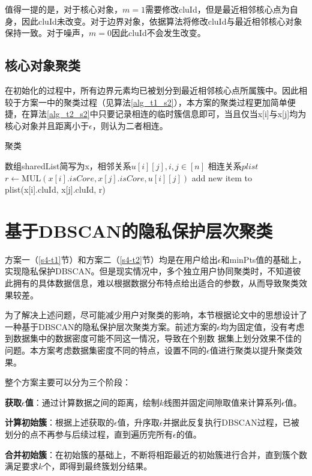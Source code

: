 值得一提的是，对于核心对象，$ m = 1 $需要修改cluId，但是最近相邻核心点为自身，因此cluId未改变。对于边界对象，依据算法将修改cluId与最近相邻核心对象保持一致。对于噪声，$ m=0 $因此cluId不会发生改变。
\subsection{核心对象聚类}
在初始化的过程中，所有边界元素均已被划分到最近相邻核心点所属簇中。因此相较于方案一中的聚类过程（见算法\ref{alg_t1_s2}），本方案的聚类过程更加简单便捷，在算法\ref{alg_t2_s2}中只要记录相连的临时簇信息即可，当且仅当x[i]与x[j]均为核心对象并且距离小于$ \epsilon $，则认为二者相连。
\begin{algorithm}[htbp]
	\renewcommand{\algorithmicrequire}{\textbf{输入:}}
	\renewcommand{\algorithmicensure}{\textbf{输出:}}
	\caption{聚类}
	\label{alg_t2_s2}
	\begin{algorithmic}[1]
		\REQUIRE 数组sharedList简写为x，相邻关系$ u[i][j],i,j\in[n] $
		\ENSURE 相连关系$ plist $
		\STATE $ r \leftarrow \text{MUL}(x[i].isCore, x[j].isCore, u[i][j]) $
		\STATE add new item to plist(x[i].cluId, x[j].cluId, r)
		\ENDFOR
		\ENDFOR
	\end{algorithmic}
\end{algorithm}
\section{基于DBSCAN的隐私保护层次聚类}
\label{s4-t3}
方案一（\ref{s4-t1}节）和方案二（\ref{s4-t2}节）均是在用户给出$\epsilon$和minPts值的基础上，实现隐私保护DBSCAN。但是现实情况中，多个独立用户协同聚类时，不知道彼此拥有的具体数据信息，难以根据数据分布特点给出适合的参数，从而导致聚类效果较差。

为了解决上述问题，尽可能减少用户对聚类的影响，本节根据论文\cite{latifi2021dbhc}中的思想设计了一种基于DBSCAN的隐私保护层次聚类方案。前述方案的$\epsilon$均为固定值，没有考虑到数据集中的数据密度可能不同这一情况，导致在个别数 据集上划分效果不佳的问题。本方案考虑数据集密度不同的特点，设置不同的$\epsilon$值进行聚类以提升聚类效果。

整个方案主要可以分为三个阶段：
\begin{compactitem}
	\item \textbf{获取$\epsilon$值}：通过计算数据之间的距离，绘制$ k $线图并固定间隙取值来计算系列$\epsilon$值。
	\item \textbf{计算初始簇}：根据上述获取的$\epsilon$值，升序取$ \epsilon $并据此反复执行DBSCAN过程，已被划分的点不再参与后续过程，直到遍历完所有$\epsilon $的值。
	\item \textbf{合并初始簇}：在初始簇的基础上，不断将相距最近的初始簇进行合并，直到簇个数满足要求$ k $个，即得到最终簇划分结果。
\end{compactitem}

